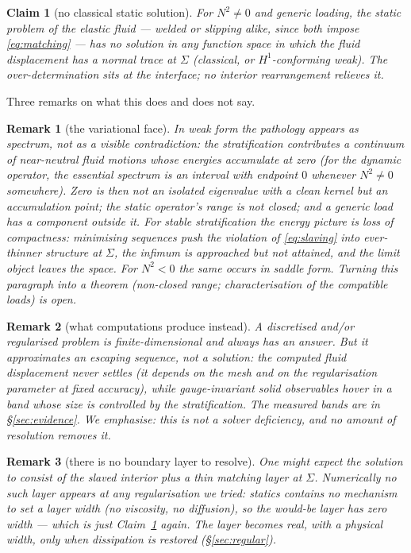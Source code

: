 \documentclass[11pt]{article}
\newtheorem{claim}{Claim}
\newtheorem{remark}{Remark}
\begin{document}
\begin{claim}[no classical static solution]
\label{claim:nonexist}
For $N^2 \ne 0$ and generic loading, the static problem of the
elastic fluid --- welded or slipping alike, since both impose
\eqref{eq:matching} --- has no solution in any function space in
which the fluid displacement has a normal trace at $\Sigma$
(classical, or $H^1$-conforming weak). The over-determination sits at
the interface; no interior rearrangement relieves it.
\end{claim}

Three remarks on what this does and does not say.

\begin{remark}[the variational face]
In weak form the pathology appears as spectrum, not as a visible
contradiction: the stratification contributes a continuum of
near-neutral fluid motions whose energies accumulate at zero
(for the dynamic operator, the essential spectrum is an interval with
endpoint $0$ whenever $N^2 \neq 0$ somewhere). Zero is then not an
isolated eigenvalue with a clean kernel but an accumulation point;
the static operator's range is not closed; and a generic load has a
component outside it. For stable stratification the energy picture is
loss of compactness: minimising sequences push the violation of
\eqref{eq:slaving} into ever-thinner structure at $\Sigma$, the
infimum is approached but not attained, and the limit object leaves
the space. For $N^2 < 0$ the same occurs in saddle form. Turning
this paragraph into a theorem (non-closed range; characterisation of
the compatible loads) is open.
\end{remark}

\begin{remark}[what computations produce instead]
A discretised and/or regularised problem is finite-dimensional and
always has an answer. But it approximates an escaping sequence, not a
solution: the computed fluid displacement never settles (it depends
on the mesh and on the regularisation parameter at fixed accuracy),
while gauge-invariant solid observables hover in a band whose size is
controlled by the stratification. The measured bands are in
\S\ref{sec:evidence}. We emphasise: this is not a solver deficiency,
and no amount of resolution removes it.
\end{remark}

\begin{remark}[there is no boundary layer to resolve]
One might expect the solution to consist of the slaved interior plus
a thin matching layer at $\Sigma$. Numerically no such layer appears
at any regularisation we tried: statics contains no mechanism to set
a layer width (no viscosity, no diffusion), so the would-be layer has
zero width --- which is just Claim~\ref{claim:nonexist} again. The
layer becomes real, with a physical width, only when dissipation is
restored (\S\ref{sec:regular}).
\end{remark}
\end{document}
